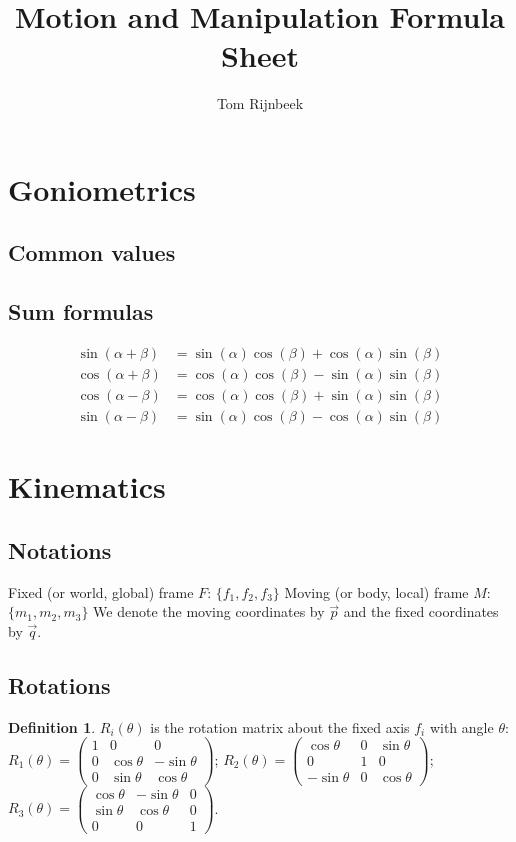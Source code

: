 \documentclass{article}
\title{Motion and Manipulation Formula Sheet}
\author{Tom Rijnbeek}
\theoremstyle{definition}
\newtheorem{definition}{Definition}[section]
\begin{document}
\section{Goniometrics}

\subsection{Common values}

\subsection{Sum formulas}
\begin{align*}
	\sin(\alpha + \beta) &= \sin(\alpha)\cos(\beta) + \cos(\alpha)\sin(\beta) \\
	\cos(\alpha + \beta) &= \cos(\alpha)\cos(\beta) - \sin(\alpha)\sin(\beta) \\
	\cos(\alpha - \beta) &= \cos(\alpha)\cos(\beta) + \sin(\alpha)\sin(\beta) \\
	\sin(\alpha - \beta) &= \sin(\alpha)\cos(\beta) - \cos(\alpha)\sin(\beta)
\end{align*}

\section{Kinematics}

\subsection{Notations}
Fixed (or world, global) frame $F$: $\{f_1, f_2, f_3\}$\newline
Moving (or body, local) frame $M$: $\{m_1, m_2, m_3\}$\newline
We denote the moving coordinates by $\vec{p}$ and the fixed coordinates by $\vec{q}$.

\subsection{Rotations}
\begin{definition}
$R_i(\theta)$ is the rotation matrix about the fixed axis $f_i$ with angle $\theta$:\newline
$R_1(\theta) = 
\begin{pmatrix}
1 & 0 & 0 \\
0 & \cos \theta & -\sin \theta \\
0 & \sin \theta & \cos \theta
\end{pmatrix}$; 
$R_2(\theta) = 
\begin{pmatrix}
\cos \theta & 0 & \sin \theta \\
0 & 1 & 0 \\
-\sin \theta & 0 & \cos \theta
\end{pmatrix}$;\newline
$R_3(\theta) = 
\begin{pmatrix}
\cos \theta & -\sin \theta & 0 \\
\sin \theta & \cos \theta & 0 \\
0 & 0 & 1
\end{pmatrix}$.
\end{definition}
\end{document}
